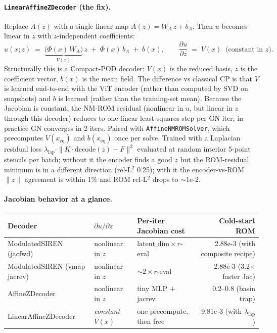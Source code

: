\paragraph{\texttt{LinearAffineZDecoder} (the fix).}
Replace $A(z)$ with a single linear map $A(z) = W_A \, z + b_A$. Then
$u$ becomes linear in $z$ with $z$-independent coefficients:
\[
u(x; z) \;=\; \underbrace{\bigl(\Phi(x)\,W_A\bigr)}_{V(x)} \, z \;+\; \Phi(x)\,b_A \;+\; b(x),
\qquad \frac{\partial u}{\partial z} \;=\; V(x) \;\;\text{(constant in } z\text{)}.
\]
Structurally this is a Compact-POD decoder: $V(x)$ is the reduced
basis, $z$ is the coefficient vector, $b(x)$ is the mean field. The
difference vs classical CP is that $V$ is learned end-to-end with the
ViT encoder (rather than computed by SVD on snapshots) and $b$ is
learned (rather than the training-set mean). Because the Jacobian is
constant, the NM-ROM residual (nonlinear in $u$, but linear in $z$
through this decoder) reduces to one linear least-squares step per GN
iter; in practice GN converges in 2 iters. Paired with
\texttt{AffineNMROMSolver}, which precomputes $V(x_{\text{eq}})$ and
$b(x_{\text{eq}})$ once per solve. Trained with a Laplacian residual
loss $\lambda_{\text{lap}} \cdot \|K \cdot \mathrm{decode}(z) - F\|^2$
evaluated at random interior 5-point stencils per batch; without it
the encoder finds a good $z$ but the ROM-residual minimum is in a
different direction (rel-L$^2$ 0.25); with it the encoder-vs-ROM $\|z\|$
agreement is within 1\% and ROM rel-L$^2$ drops to $\sim$1e-2.

\paragraph{Jacobian behavior at a glance.}

\begin{center}
\begin{tabular}{l l l r}
  \textbf{Decoder} & \textbf{$\partial u / \partial z$} & \textbf{Per-iter Jacobian cost} & \textbf{Cold-start ROM} \\
  \hline
  ModulatedSIREN (jacfwd)       & nonlinear in $z$ & $\mathrm{latent\_dim} \times r$-eval & 2.88e-3 (with composite recipe) \\
  ModulatedSIREN (vmap jacrev)  & nonlinear in $z$ & $\sim 2 \times r$-eval              & 2.88e-3 (3.2$\times$ faster Jac)    \\
  AffineZDecoder                & nonlinear in $z$ & tiny MLP $+$ jacrev                  & 0.2--0.8 (basin trap)               \\
  LinearAffineZDecoder          & \emph{constant} $V(x)$ & one precompute, then free       & 9.81e-3 (with $\lambda_{\text{lap}}$) \\
\end{tabular}
\end{center}

